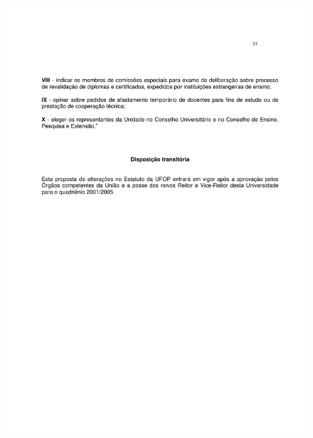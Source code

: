 \begin{figure}[p]
	\centering 
	\includegraphics[scale=0.7]{capitulos/resolucoes/cuni414/cuni414-33.pdf}
\end{figure}

